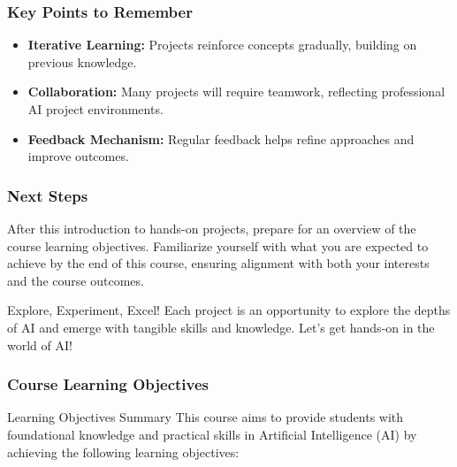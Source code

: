 \documentclass[aspectratio=169]{beamer}
\begin{document}
\begin{frame}[fragile]
    \frametitle{Key Points to Remember}
    \begin{itemize}
        \item \textbf{Iterative Learning:} Projects reinforce concepts gradually, building on previous knowledge.
        \item \textbf{Collaboration:} Many projects will require teamwork, reflecting professional AI project environments.
        \item \textbf{Feedback Mechanism:} Regular feedback helps refine approaches and improve outcomes.
    \end{itemize}
\end{frame}

\begin{frame}[fragile]
    \frametitle{Next Steps}
    After this introduction to hands-on projects, prepare for an overview of the course learning objectives. Familiarize yourself with what you are expected to achieve by the end of this course, ensuring alignment with both your interests and the course outcomes.
    
    \begin{block}{Explore, Experiment, Excel!}
        Each project is an opportunity to explore the depths of AI and emerge with tangible skills and knowledge. Let's get hands-on in the world of AI!
    \end{block}
\end{frame}

\begin{frame}[fragile]
    \frametitle{Course Learning Objectives}
    \begin{block}{Learning Objectives Summary}
        This course aims to provide students with foundational knowledge and practical skills in Artificial Intelligence (AI) by achieving the following learning objectives:
    \end{block}
\end{frame}
\end{document}
